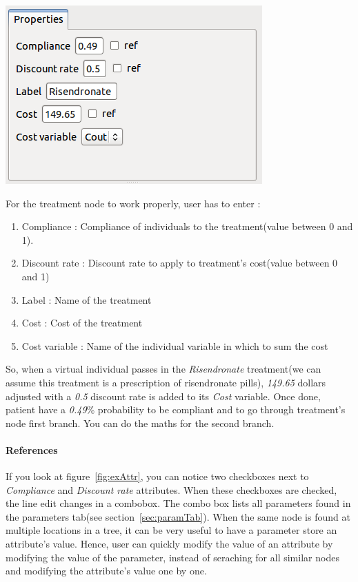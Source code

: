 \documentclass[a4paper,11pt]{report}
\begin{document}
\begin{center}
\includegraphics[scale=0.4]{Pictures/TreeEditor/treatmentAttr.png}
\label{fig:exAttr}
\end{center}

For the treatment node to work properly, user has to enter :
\begin{enumerate}
\item{Compliance :} Compliance of individuals to the treatment(value between 0 and 1).
\item{Discount rate :} Discount rate to apply to treatment's cost(value between 0 and 1)
\item{Label :} Name of the treatment
\item{Cost : } Cost of the treatment
\item{Cost variable :} Name of the individual variable in which to sum the cost
\end{enumerate}
So, when a virtual individual passes in the \emph{Risendronate} treatment(we can assume this treatment is a prescription of risendronate pills), \emph{149.65} dollars adjusted with a \emph{0.5} discount rate is added to its \emph{Cost} variable. Once done, patient have a \emph{0.49}\% probability to be compliant and to go through treatment's node first branch. You can do the maths for the second branch.

\paragraph{References}
If you look at figure~\ref{fig:exAttr}, you can notice two checkboxes next to \emph{Compliance} and \emph{Discount rate} attributes. When these checkboxes are checked, the line edit changes in a combobox. The combo box lists all parameters found in the parameters tab(see section~\ref{sec:paramTab}). When the same node is found at multiple locations in a tree, it can be very useful to have a parameter store an attribute's value. Hence, user can quickly modify the value of an attribute by modifying the value of the parameter, instead of seraching for all similar nodes and modifying the attribute's value one by one.
\end{document}
